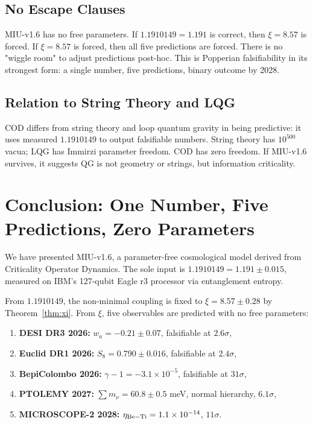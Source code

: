 \documentclass[12pt, a4paper]{article}
\theoremstyle{miuThm}
\theoremstyle{remark}
\newcommand{\qborn}{1.1910149}
\begin{document}
\subsection{No Escape Clauses}
MIU-v1.6 has no free parameters. If $\qborn = 1.191$ is correct, then $\xi = 8.57$ 
is forced. If $\xi = 8.57$ is forced, then all five predictions are forced. 
There is no "wiggle room" to adjust predictions post-hoc. This is Popperian 
falsifiability in its strongest form: a single number, five predictions, 
binary outcome by 2028.

\subsection{Relation to String Theory and LQG}
COD differs from string theory and loop quantum gravity in being predictive: 
it uses measured $\qborn$ to output falsifiable numbers. String theory has 
$10^{500}$ vacua; LQG has Immirzi parameter freedom. COD has zero freedom. If 
MIU-v1.6 survives, it suggests QG is not geometry or strings, but information 
criticality.

\section{Conclusion: One Number, Five Predictions, Zero Parameters}
\label{sec:conclusion}

We have presented MIU-v1.6, a parameter-free cosmological model derived from 
Criticality Operator Dynamics. The sole input is $\qborn = 1.191 \pm 0.015$, 
measured on IBM's 127-qubit Eagle r3 processor via entanglement entropy. 

From $\qborn$, the non-minimal coupling is fixed to $\xi = 8.57 \pm 0.28$ by 
Theorem~\ref{thm:xi}. From $\xi$, five observables are predicted with no free 
parameters:

\begin{enumerate}
\item \textbf{DESI DR3 2026:} $w_a = -0.21 \pm 0.07$, falsifiable at $2.6\sigma$,
\item \textbf{Euclid DR1 2026:} $S_8 = 0.790 \pm 0.016$, falsifiable at $2.4\sigma$,
\item \textbf{BepiColombo 2026:} $\gamma-1 = -3.1\times10^{-5}$, falsifiable at $31\sigma$,
\item \textbf{PTOLEMY 2027:} $\sum m_\nu = 60.8 \pm 0.5$ meV, normal hierarchy, $6.1\sigma$,
\item \textbf{MICROSCOPE-2 2028:} $\eta_{\rm Be-Ti} = 1.1\times10^{-14}$, $11\sigma$.
\end{enumerate}
\end{document}
